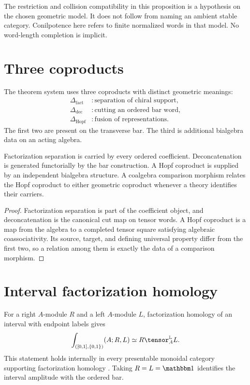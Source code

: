 The restriction and collision compatibility in this proposition is a hypothesis on the
chosen geometric model. It does not follow from naming an ambient stable category.
Conilpotence here refers to finite normalized words in that model.
No word-length completion is implicit.


\section{Three coproducts}
The theorem system uses three coproducts with distinct geometric meanings:
\[
\begin{aligned}
 \Delta_{\mathrm{fact}}&:\text{separation of chiral support},\\
 \Delta_{\mathrm{dec}}&:\text{cutting an ordered bar word},\\
 \Delta_{\mathrm{Hopf}}&:\text{fusion of representations}.
\end{aligned}
\]
The first two are present on the transverse bar.  The third is additional bialgebra data on an acting algebra.

\begin{proposition}
Factorization separation is carried by every ordered coefficient.  Deconcatenation is generated functorially by the bar construction.  A Hopf coproduct is supplied by an independent bialgebra structure.  A coalgebra comparison morphism relates the Hopf coproduct to either geometric coproduct whenever a theory identifies their carriers.
\end{proposition}
\begin{proof}
Factorization separation is part of the coefficient object, and deconcatenation is the canonical cut map on tensor words.  A Hopf coproduct is a map from the algebra to a completed tensor square satisfying algebraic coassociativity.  Its source, target, and defining universal property differ from the first two, so a relation among them is exactly the data of a comparison morphism.
\end{proof}

\section{Interval factorization homology}
For a right $A$-module $R$ and a left $A$-module $L$, factorization homology of an interval with endpoint labels gives
\[
 \int_{([0,1],\{0,1\})}(A;R,L)
 \simeq R\tensor_A^{\mathbb L}L.
\]
This statement holds internally in every presentable monoidal category supporting factorization homology \cite{AFT,LurieHA}. Taking $R=L=\mathbbm1$ identifies the interval amplitude with the ordered bar.

